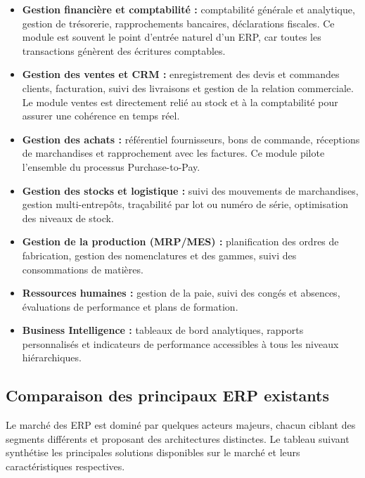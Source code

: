 \documentclass[a4paper,12pt]{report}
\begin{document}
\begin{itemize}
    \item \textbf{Gestion financière et comptabilité :} comptabilité générale et
    analytique, gestion de trésorerie, rapprochements bancaires, déclarations
    fiscales. Ce module est souvent le point d'entrée naturel d'un ERP, car
    toutes les transactions génèrent des écritures comptables.

    \item \textbf{Gestion des ventes et CRM :} enregistrement des devis et
    commandes clients, facturation, suivi des livraisons et gestion de la
    relation commerciale. Le module ventes est directement relié au stock et à
    la comptabilité pour assurer une cohérence en temps réel.

    \item \textbf{Gestion des achats :} référentiel fournisseurs, bons de
    commande, réceptions de marchandises et rapprochement avec les factures. Ce
    module pilote l'ensemble du processus Purchase-to-Pay.

    \item \textbf{Gestion des stocks et logistique :} suivi des mouvements de
    marchandises, gestion multi-entrepôts, traçabilité par lot ou numéro de
    série, optimisation des niveaux de stock.

    \item \textbf{Gestion de la production (MRP/MES) :} planification des ordres
    de fabrication, gestion des nomenclatures et des gammes, suivi des
    consommations de matières.

    \item \textbf{Ressources humaines :} gestion de la paie, suivi des congés et
    absences, évaluations de performance et plans de formation.

    \item \textbf{Business Intelligence :} tableaux de bord analytiques, rapports
    personnalisés et indicateurs de performance accessibles à tous les niveaux
    hiérarchiques.
\end{itemize}

\subsection{Comparaison des principaux ERP existants}

Le marché des ERP est dominé par quelques acteurs majeurs, chacun ciblant des
segments différents et proposant des architectures distinctes. Le
tableau suivant synthétise les principales solutions disponibles
sur le marché et leurs caractéristiques respectives.
\end{document}
